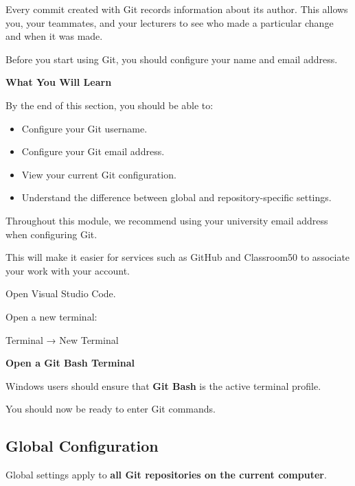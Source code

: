 \documentclass{csc2059practical}
\begin{document}
Every commit created with Git records information about its author. This allows you, your teammates, and your lecturers to see who made a particular change and when it was made.

Before you start using Git, you should configure your name and email address.

\begin{learningoutcomes}
\textbf{What You Will Learn}\par
\medskip
By the end of this section, you should be able to:

\begin{itemize}
  \item Configure your Git username.
  \item Configure your Git email address.
  \item View your current Git configuration.
  \item Understand the difference between global and repository-specific settings.
\end{itemize}
\end{learningoutcomes}
\begin{importantnote}

Throughout this module, we recommend using your university email address when configuring Git.


This will make it easier for services such as GitHub and Classroom50 to associate your work with your account.


\end{importantnote}

Open Visual Studio Code.


Open a new terminal:


Terminal → New Terminal

\begin{commonerror}
  \textbf{Open a Git Bash Terminal}\par
  \medskip

Windows users should ensure that \textbf{Git Bash} is the active terminal profile.

\end{commonerror}

You should now be ready to enter Git commands.


\subsection{Global Configuration}
Global settings apply to \textbf{all Git repositories on the current computer}.
\end{document}
